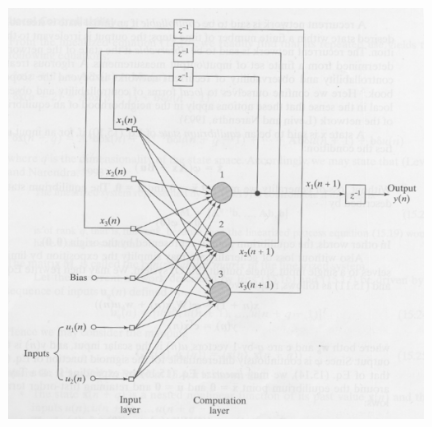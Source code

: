 \documentclass[10pt]{article}
\begin{document}
\begin{enumerate}
\hspace{2cm}\includegraphics[width=11cm]{l12k9.eps}


\end{enumerate}
\end{document}
